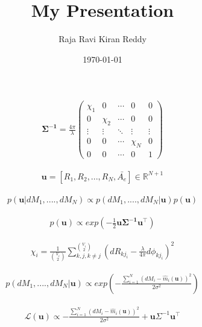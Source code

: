 \documentclass{beamer}
\title{My Presentation}
\author{Raja Ravi Kiran Reddy}
\institute{IITH(AI)}
\date{\today}
\providecommand{\brak}[1]{\ensuremath{\left(#1\right)}}
\begin{document}
\begin{frame}
\titlepage
\end{frame}
\begin{frame}{}
   \begin{align}
    \boldsymbol{\Sigma^{-1}}=\frac{4\pi}{\lambda}\begin{pmatrix}
\chi_1 & 0      & \cdots & 0       & 0 \\
0      & \chi_2 & \cdots & 0       & 0 \\
\vdots & \vdots & \ddots & \vdots  & \vdots  \\
0      & 0      & \cdots & \chi_{N}& 0\\
0      &0       &\cdots  &0        & 1
\end{pmatrix}
\end{align} 
\end{frame}
\begin{frame}{}
\begin{align}
    \boldsymbol{u}=[R_1,R_2,...,R_N,\bar{A_e}] \in \mathbb{R}^{N+1}
\end{align}
\end{frame}
\begin{frame}{}
  \begin{align}
      \mathit{p}(\boldsymbol{u}|dM_1,....,dM_N) \propto \mathit{p}(dM_1,....,dM_N|\boldsymbol{u})\mathit{p}(\boldsymbol{u})
  \end{align}  
\end{frame}
\begin{frame}{}
    \begin{align}
        p(\boldsymbol{u})\propto exp\brak{-\frac{1}{2}\boldsymbol{u}\boldsymbol{\Sigma^{-1}}\boldsymbol{u}^{\top}}
    \end{align}
\end{frame}
\begin{frame}{}
    \begin{align}
        \chi_i = \frac{1}{\binom{V_i}{2}}\sum_{k,j,k\neq j}^{\binom{V_i}{2}}\brak{dR_{kj_i}-\frac{\lambda}{4\pi}d\phi_{kj_i}}^2
    \end{align}
\end{frame}
\begin{frame}{}
    \begin{align}
       \mathit{p}(dM_1,....,dM_N|\boldsymbol{u})\propto exp\brak{-\frac{\sum_{i=1}^{N}\brak{dM_i-\hat{m}_i(\boldsymbol{u})}^2}{2\sigma^2}} 
    \end{align}
\end{frame}
\begin{frame}{}
    \begin{align}
        \mathcal{L}(\boldsymbol{u})\propto -\frac{\sum_{i=1}^{N}\brak{dM_i-\hat{m}_i(\boldsymbol{u})}^2}{2\sigma^2} + \boldsymbol{u}\Sigma^{-1}\boldsymbol{u}^{\top} 
    \end{align}
\end{frame}
\end{document}
